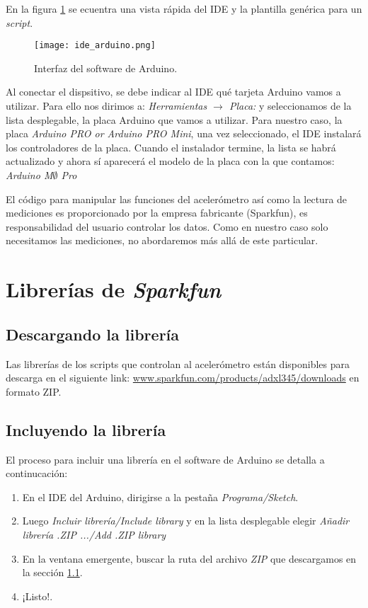 \documentclass[10pt, a4paper, twocolumn]{article} %
\begin{document}
En la figura \ref{fg:ide} se ecuentra una vista rápida del IDE y la plantilla genérica para un \textit{script}.

\begin{figure}[htbp!]
	\begin{center}
		\texttt{[image: ide\_arduino.png]} %
		\caption{Interfaz del software de Arduino.} %
		\label{fg:ide}
	\end{center}
\end{figure}

Al conectar el dispsitivo, se debe indicar al IDE qué tarjeta Arduino vamos a utilizar. Para ello nos dirimos a: \textit{Herramientas $\rightarrow$ Placa:} y seleccionamos de la lista desplegable, la placa Arduino que vamos a utilizar. Para nuestro caso, la placa \textit{Arduino PRO or Arduino PRO Mini}, una vez seleccionado, el IDE instalará los controladores de la placa. Cuando el instalador termine, la lista se habrá actualizado y ahora sí aparecerá el modelo de la placa con la que contamos: \textit{Arduino M$\emptyset$ Pro}

El código para manipular las funciones del acelerómetro así como la lectura de mediciones es proporcionado por la empresa fabricante (Sparkfun), es responsabilidad del usuario controlar los datos. Como en nuestro caso solo necesitamos las mediciones, no abordaremos más allá de este particular.


\section{Librerías de \textit{Sparkfun}}


\subsection{Descargando la librería}
\label{subsec:libreria}
Las librerías de los scripts que controlan al acelerómetro están disponibles para descarga en el siguiente link: \url{www.sparkfun.com/products/adxl345/downloads} en formato ZIP.

\subsection{Incluyendo la librería}

El proceso para incluir una librería en el software de Arduino se detalla a continucación:

\begin{enumerate}
\item En el IDE del Arduino, dirigirse a la pestaña \textit{Programa/Sketch}.
\item Luego \textit{Incluir librería/Include library} y en la lista desplegable elegir \textit{Añadir librería .ZIP .../Add .ZIP library} 
\item En la ventana emergente, buscar la ruta del archivo \textit{ZIP} que descargamos en la sección \ref{subsec:libreria}.
\item ¡Listo!.
\end{enumerate}
\end{document}
